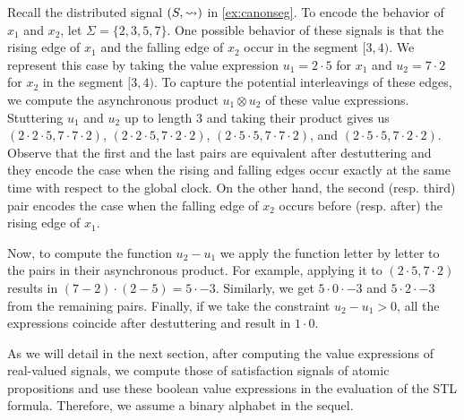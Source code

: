 \begin{example} \label{ex:valexpr}
	Recall the distributed signal $(S, {\rightsquigarrow})$ in \cref{ex:canonseg}.
	To encode the behavior of $x_1$ and $x_2$, let $\Sigma = \{2, 3, 5, 7\}$.
	One possible behavior of these signals is that the rising edge of $x_1$ and the falling edge of $x_2$ occur in the segment $[3,4)$.
	We represent this case by taking the value expression $u_1 = 2 \cdot 5$ for $x_1$ and $u_2 = 7 \cdot 2$ for $x_2$ in the segment $[3,4)$.
	To capture the potential interleavings of these edges, we compute the asynchronous product $u_1 \otimes u_2$ of these value expressions.
	Stuttering $u_1$ and $u_2$ up to length 3 and taking their product gives us
	$(2 \cdot 2 \cdot 5, 7 \cdot 7 \cdot 2)$,
	$(2 \cdot 2 \cdot 5, 7 \cdot 2 \cdot 2)$,
	$(2 \cdot 5 \cdot 5, 7 \cdot 7 \cdot 2)$, and
	$(2 \cdot 5 \cdot 5, 7 \cdot 2 \cdot 2)$.
	Observe that the first and the last pairs are equivalent after destuttering and they encode the case when the rising and falling edges occur exactly at the same time with respect to the global clock.
	On the other hand, the second (resp. third) pair encodes the case when the falling edge of $x_2$ occurs before (resp. after) the rising edge of $x_1$.
	
	Now, to compute the function $u_2 - u_1$ we apply the function letter by letter to the pairs in their asynchronous product.
	For example, applying it to $(2 \cdot 5, 7 \cdot 2)$ results in $(7 - 2) \cdot (2 - 5) = 5 \cdot -3$.
	Similarly, we get $5 \cdot 0 \cdot -3$ and $5 \cdot 2 \cdot -3$ from the remaining pairs.
	Finally, if we take the constraint $u_2 - u_1  > 0$, all the expressions coincide after destuttering and result in $1 \cdot 0$.
\end{example}


As we will detail in the next section, after computing the value expressions of real-valued signals, we compute those of satisfaction signals of atomic propositions and use these boolean value expressions in the evaluation of the STL formula.
Therefore, we assume a binary alphabet in the sequel.

